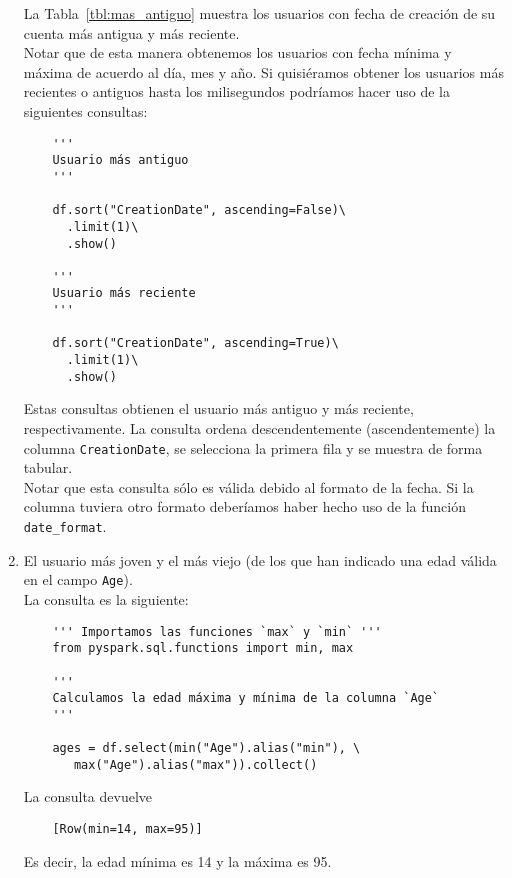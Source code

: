 \documentclass[12pt,a4paper,twoside,openright,titlepage,final]{article}
\begin{document}
\begin{enumerate}
	La Tabla~\ref{tbl:mas_antiguo} muestra los usuarios con fecha de creación de su cuenta más antigua y más reciente.\\
	
	Notar que de esta manera obtenemos los usuarios con fecha  mínima y máxima de acuerdo al día, mes y año. Si quisiéramos obtener los usuarios más recientes o antiguos hasta los milisegundos podríamos hacer uso de la siguientes consultas: 
	
	\begin{verbatim}
	''' 
	Usuario más antiguo 
	'''
	
	df.sort("CreationDate", ascending=False)\
	  .limit(1)\
	  .show()
	
	''' 
	Usuario más reciente 
	'''
	
	df.sort("CreationDate", ascending=True)\
	  .limit(1)\
	  .show()
	\end{verbatim}
	
	Estas consultas obtienen el usuario más antiguo y más reciente, respectivamente. La consulta ordena descendentemente (ascendentemente) la columna \texttt{CreationDate}, se selecciona la primera fila y se muestra de forma tabular.\\
	
	Notar que esta consulta sólo es válida debido al formato de la fecha. Si la columna tuviera otro formato deberíamos haber hecho uso de la función \texttt{date\_format}.  
	
	\item El usuario más joven y el más viejo (de los que han indicado una edad válida en el campo \texttt{Age}).\\
	
	La consulta es la siguiente:
	
	\begin{verbatim}
	''' Importamos las funciones `max` y `min` '''
	from pyspark.sql.functions import min, max
	
	''' 
	Calculamos la edad máxima y mínima de la columna `Age` 
	'''
	
	ages = df.select(min("Age").alias("min"), \
       max("Age").alias("max")).collect()
	\end{verbatim}
	
	La consulta devuelve 
	
	\begin{verbatim}
	[Row(min=14, max=95)]
	\end{verbatim}
	
	Es decir, la edad mínima es 14 y la máxima es 95.\\
	

\end{enumerate}
\end{document}
